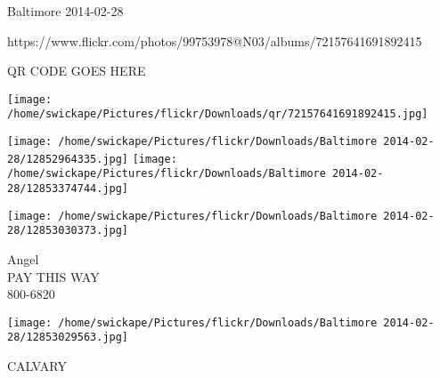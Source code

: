 \documentclass[10pt,letterpaper]{article}
\begin{document}
Baltimore 2014-02-28

https://www.flickr.com/photos/99753978@N03/albums/72157641691892415

QR CODE GOES HERE

\texttt{[image: /home/swickape/Pictures/flickr/Downloads/qr/72157641691892415.jpg]}
\pagebreak

\texttt{[image: /home/swickape/Pictures/flickr/Downloads/Baltimore 2014-02-28/12852964335.jpg]}
\texttt{[image: /home/swickape/Pictures/flickr/Downloads/Baltimore 2014-02-28/12853374744.jpg]}

\vspace{0.25in}
\texttt{[image: /home/swickape/Pictures/flickr/Downloads/Baltimore 2014-02-28/12853030373.jpg]}

Angel\\
PAY THIS WAY\\
800{-}6820\\
\pagebreak

\texttt{[image: /home/swickape/Pictures/flickr/Downloads/Baltimore 2014-02-28/12853029563.jpg]}

CALVARY\\
\pagebreak
\end{document}
